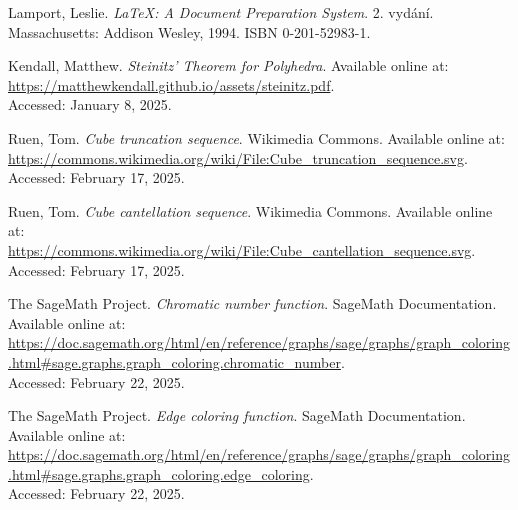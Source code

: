 
\def\bibname{Bibliography}
\begin{thebibliography}{99}
\addcontentsline{toc}{chapter}{\bibname}


  {\sc Lamport,} Leslie.
  \emph{\LaTeX: A Document Preparation System}.
  2. vydání.
  Massachusetts: Addison Wesley, 1994.
  ISBN 0-201-52983-1.

  {\sc Kendall,} Matthew.
  \emph{Steinitz’ Theorem for Polyhedra}. Available online at: \\ \url{https://matthewkendall.github.io/assets/steinitz.pdf}. \\
  Accessed: January 8, 2025.


  {\sc Ruen, Tom.} 
  \emph{Cube truncation sequence}. 
  Wikimedia Commons. Available online at: \\ \url{https://commons.wikimedia.org/wiki/File:Cube_truncation_sequence.svg}. \\
  Accessed: February 17, 2025.

  {\sc Ruen, Tom.} 
  \emph{Cube cantellation sequence}. 
  Wikimedia Commons. Available online at: \\ \url{https://commons.wikimedia.org/wiki/File:Cube_cantellation_sequence.svg}. \\
  Accessed: February 17, 2025.


  {\sc The SageMath Project.} 
  \emph{Chromatic number function}. 
  SageMath Documentation. Available online at: \\ 
  \url{https://doc.sagemath.org/html/en/reference/graphs/sage/graphs/graph_coloring.html#sage.graphs.graph_coloring.chromatic_number}. \\
  Accessed: February 22, 2025.

  {\sc The SageMath Project.} 
  \emph{Edge coloring function}. 
  SageMath Documentation. Available online at: \\ 
  \url{https://doc.sagemath.org/html/en/reference/graphs/sage/graphs/graph_coloring.html#sage.graphs.graph_coloring.edge_coloring}. \\
  Accessed: February 22, 2025.

\end{thebibliography}
